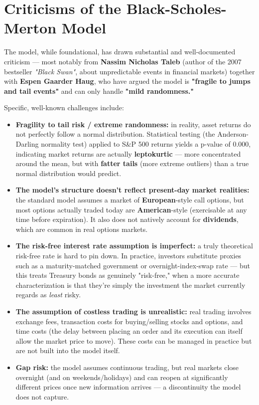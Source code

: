 \documentclass[12pt,openany]{book}
\theoremstyle{definition}
\theoremstyle{remark}
\begin{document}
\section{Criticisms of the Black-Scholes-Merton Model}

The model, while foundational, has drawn substantial and well-documented criticism --- most notably from \textbf{Nassim Nicholas Taleb} (author of the 2007 bestseller \emph{"Black Swan"}, about unpredictable events in financial markets) together with \textbf{Espen Gaarder Haug}, who have argued the model is \textbf{"fragile to jumps and tail events"} and can only handle \textbf{"mild randomness."}

Specific, well-known challenges include:

\begin{itemize}
\item \textbf{Fragility to tail risk / extreme randomness:} in reality, asset returns do not perfectly follow a normal distribution. Statistical testing (the Anderson-Darling normality test) applied to S\&P 500 returns yields a p-value of 0.000, indicating market returns are actually \textbf{leptokurtic} --- more concentrated around the mean, but with \textbf{fatter tails} (more extreme outliers) than a true normal distribution would predict.


\item \textbf{The model's structure doesn't reflect present-day market realities:} the standard model assumes a market of \textbf{European}-style call options, but most options actually traded today are \textbf{American}-style (exercisable at any time before expiration). It also does not natively account for \textbf{dividends}, which are common in real options markets.


\item \textbf{The risk-free interest rate assumption is imperfect:} a truly theoretical risk-free rate is hard to pin down. In practice, investors substitute proxies such as a maturity-matched government or overnight-index-swap rate --- but this treats Treasury bonds as genuinely "risk-free," when a more accurate characterization is that they're simply the investment the market currently regards as \emph{least} risky.


\item \textbf{The assumption of costless trading is unrealistic:} real trading involves exchange fees, transaction costs for buying/selling stocks and options, and time costs (the delay between placing an order and its execution can itself allow the market price to move). These costs can be managed in practice but are not built into the model itself.


\item \textbf{Gap risk:} the model assumes continuous trading, but real markets close overnight (and on weekends/holidays) and can reopen at significantly different prices once new information arrives --- a discontinuity the model does not capture.


\end{itemize}
\end{document}
